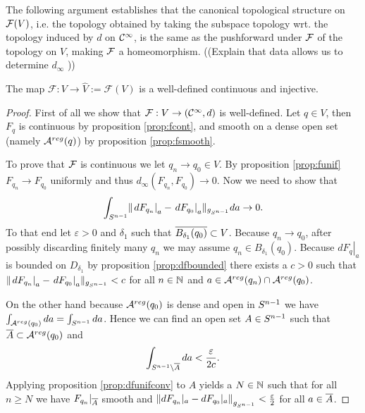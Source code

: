 The following argument establishes that the canonical topological structure on ${\mathcal{F}}(V)$, i.e. the topology obtained by taking the subspace topology wrt. the topology induced by $d$ on ${\mathcal{C}}^\infty$, is the same as the pushforward under ${\mathcal{F}}$ of the topology on $V$, making ${\mathcal{F}}$ a homeomorphism.
((Explain that data allows us to determine $d_\infty$ ))
\begin{lemma}\label{lem:Fprop}
The map $\mathcal{F}:V\to\widehat{V}:=\mathcal{F}(V)$ is a well-defined continuous and injective.
\end{lemma}
\begin{proof}
First of all we show that $\mathcal{F}:V\to ({\mathcal{C}}^\infty,d)$ is well-defined. Let $q\in V$, then $F_q$ is continuous by proposition \ref{prop:fcont}, and smooth on a dense open set (namely ${{\mathcal{A}}^{reg}}(q)$) by proposition \ref{prop:fsmooth}.

To prove that $\mathcal{F}$ is continuous we let $q_n\to q_0 \in V$. By proposition \ref{prop:funif} $F_{q_n}\to F_{q_0}$ uniformly and thus $d_\infty(F_{q_n},F_{q_0})\to 0$. Now we need to show that 
\[
    \int_{{S^{n-1}}} \lVert \left.dF_{q_n}\right\rvert_a - \left.dF_{q_0}\right\rvert_a \rVert_{g_{S^{n-1}}}da \to 0.
\]
To that end let $\varepsilon>0$ and $\delta_1$ such that ${\overline{B_{\delta_1}(q_0)}}\subset V$. Because $q_n\to q_0$, after possibly discarding finitely many $q_n$ we may assume $q_n \in B_{\delta_1}(q_0)$. 
Because $\left.dF_{q}\right\rvert_a$ is bounded on $D_{\delta_1}$ by proposition \ref{prop:dfbounded} there exists a $c>0$ such that $\lVert \left.dF_{q_n}\right\rvert_a - \left.dF_{q_0}\right\rvert_a \rVert_{g_{S^{n-1}}}<c$ for all $n\in \mathbb{N}$ and $a\in {{\mathcal{A}}^{reg}}(q_n)\cap {{\mathcal{A}}^{reg}}(q_0)$. 

On the other hand because ${{\mathcal{A}}^{reg}}(q_0)$ is dense and open in ${S^{n-1}}$ we have $\int_{{{\mathcal{A}}^{reg}}(q_0)}da=\int_{{S^{n-1}}}da$. Hence we can find an open set $A\in {S^{n-1}}$ such that ${\overline{A}}\subset {{\mathcal{A}}^{reg}}(q_0)$ and 
\[
    \int_{{S^{n-1}} \setminus {\overline{A}}}da< \frac{\varepsilon}{2c}.
\]
Applying proposition \ref{prop:dfunifconv} to $A$ yields a $N\in \mathbb{N}$ such that for all $n\ge N$ we have $F_{q_n}\rvert_{{\overline{A}}}$ smooth and $\left\lVert dF_{q_n}\rvert_{a} - dF_{q_0}\rvert_{a}\right\rVert_{g_{{S^{n-1}}}}<\frac{\varepsilon}{2}$ for all $a\in {\overline{A}}$.


\end{proof}
